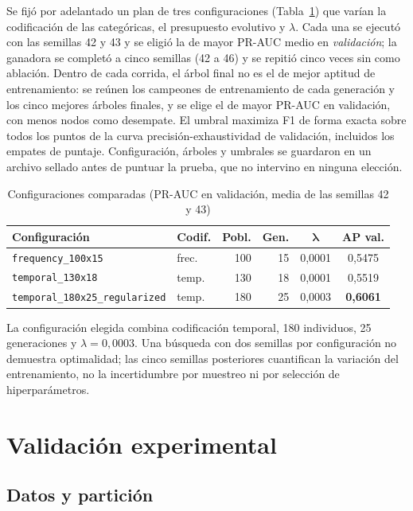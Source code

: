 \documentclass[conference]{IEEEtran}
\newcommand{\col}[1]{\texttt{\detokenize{#1}}}
\begin{document}
Se fijó por adelantado un plan de tres configuraciones
(Tabla~\ref{tab:configs}) que varían la codificación de las categóricas, el
presupuesto evolutivo y $\lambda$. Cada una se ejecutó con las semillas 42 y
43 y se eligió la de mayor PR-AUC medio en \emph{validación}; la ganadora se
completó a cinco semillas (42 a 46) y se repitió cinco veces sin
\col{DOM_DOMAIN_ID} como ablación. Dentro de cada corrida, el árbol final no
es el de mejor aptitud de entrenamiento: se reúnen los campeones de
entrenamiento de cada generación y los cinco mejores árboles finales, y se
elige el de mayor PR-AUC en validación, con menos nodos como desempate. El
umbral maximiza F1 de forma exacta sobre todos los puntos de la curva
precisión-exhaustividad de validación, incluidos los empates de puntaje.
Configuración, árboles y umbrales se guardaron en un archivo sellado antes de
puntuar la prueba, que no intervino en ninguna elección.

\begin{table}[htbp]
\caption{Configuraciones comparadas (PR-AUC en validación, media de las semillas 42 y 43)}
\label{tab:configs}
\centering
\scriptsize
\setlength{\tabcolsep}{3pt}
\begin{tabular}{llrrcc}
\toprule
\textbf{Configuración} & \textbf{Codif.} & \textbf{Pobl.} & \textbf{Gen.} & $\boldsymbol{\lambda}$ & \textbf{AP val.}\\
\midrule
\texttt{frequency\_100x15} & frec. & 100 & 15 & 0,0001 & 0,5475\\
\texttt{temporal\_130x18} & temp. & 130 & 18 & 0,0001 & 0,5519\\
\texttt{temporal\_180x25\_regularized} & temp. & 180 & 25 & 0,0003 & \textbf{0,6061}\\
\bottomrule
\end{tabular}
\end{table}

La configuración elegida combina codificación temporal, 180 individuos,
25 generaciones y
$\lambda = 0{,}0003$. Una búsqueda con dos semillas por configuración no
demuestra optimalidad; las cinco semillas posteriores cuantifican la variación
del entrenamiento, no la incertidumbre por muestreo ni por selección de
hiperparámetros.

\section{Validación experimental}

\subsection{Datos y partición}
\label{sec:datos}
\end{document}
